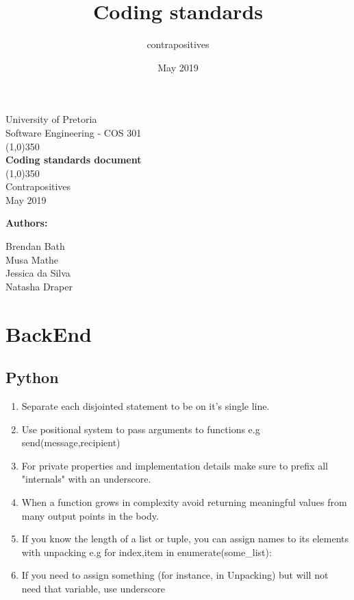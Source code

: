 \documentclass{article}
\title{Coding standards}
\author{contrapositives }
\date{May 2019}
\begin{document}
\begin{titlepage}
	\begin{center}
	\huge{University of Pretoria\\
	Software Engineering - COS 301}\\
	\line(1,0){350}\\
	\huge{\bfseries Coding standards document}\\
	\line(1,0){350}\\
	Contrapositives\\
	May 2019\\
	[3cm]
	\end{center}
	\begin{flushleft}
	\bfseries{Authors:}
	\end{flushleft}
	\begin{flushleft}
	Brendan Bath \\
	Musa Mathe			\\
	Jessica da Silva			\\
	Natasha Draper     \\

	\end{flushleft}
\end{titlepage}
\maketitle


\section{BackEnd}
    \subsection{Python}
            \begin{enumerate}
                \item Separate each disjointed statement to be on it's single line.
                \item Use positional system to pass arguments to functions e.g send(message,recipient)
                \item For private properties and implementation details make sure to prefix all "internals" with an underscore.
                \item When a function grows in complexity avoid returning meaningful values from many output points in the body.
                \item If you know the length of a list or tuple, you can assign names to its elements with unpacking e.g for index,item in enumerate(some_list):
                
                \item If you need to assign something (for instance, in Unpacking) but will not need that variable, use underscore
                
                
            \end{enumerate}        
    
\end{document}
